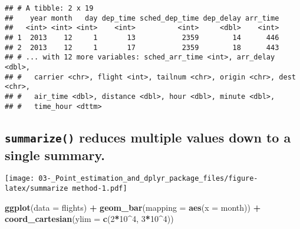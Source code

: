 \documentclass[]{article}
\newenvironment{Shaded}{\begin{snugshade}}{\end{snugshade}}
\newcommand{\DataTypeTok}[1]{\textcolor[rgb]{0.13,0.29,0.53}{#1}}
\newcommand{\DecValTok}[1]{\textcolor[rgb]{0.00,0.00,0.81}{#1}}
\newcommand{\KeywordTok}[1]{\textcolor[rgb]{0.13,0.29,0.53}{\textbf{#1}}}
\newcommand{\NormalTok}[1]{#1}
\newcommand{\OperatorTok}[1]{\textcolor[rgb]{0.81,0.36,0.00}{\textbf{#1}}}
\newcommand{\StringTok}[1]{\textcolor[rgb]{0.31,0.60,0.02}{#1}}
\begin{document}
\begin{verbatim}
## # A tibble: 2 x 19
##    year month   day dep_time sched_dep_time dep_delay arr_time
##   <int> <int> <int>    <int>          <int>     <dbl>    <int>
## 1  2013    12     1       13           2359        14      446
## 2  2013    12     1       17           2359        18      443
## # ... with 12 more variables: sched_arr_time <int>, arr_delay <dbl>,
## #   carrier <chr>, flight <int>, tailnum <chr>, origin <chr>, dest <chr>,
## #   air_time <dbl>, distance <dbl>, hour <dbl>, minute <dbl>,
## #   time_hour <dttm>
\end{verbatim}

\hypertarget{summarize-reduces-multiple-values-down-to-a-single-summary.}{%
\subsection{\texorpdfstring{\texttt{summarize()} reduces multiple values
down to a single
summary.}{summarize() reduces multiple values down to a single summary.}}\label{summarize-reduces-multiple-values-down-to-a-single-summary.}}

\begin{Shaded}
\end{Shaded}

\texttt{[image: 03-\_Point\_estimation\_and\_dplyr\_package\_files/figure-latex/summarize method-1.pdf]}

\begin{Shaded}
\begin{Highlighting}[]
\KeywordTok{ggplot}\NormalTok{(}\DataTypeTok{data =}\NormalTok{ flights) }\OperatorTok{+}\StringTok{ }
\StringTok{  }\KeywordTok{geom_bar}\NormalTok{(}\DataTypeTok{mapping =} \KeywordTok{aes}\NormalTok{(}\DataTypeTok{x =}\NormalTok{ month)) }\OperatorTok{+}
\StringTok{ }\KeywordTok{coord_cartesian}\NormalTok{(}\DataTypeTok{ylim =} \KeywordTok{c}\NormalTok{(}\DecValTok{2}\OperatorTok{*}\DecValTok{10}\OperatorTok{^}\DecValTok{4}\NormalTok{, }\DecValTok{3}\OperatorTok{*}\DecValTok{10}\OperatorTok{^}\DecValTok{4}\NormalTok{))}
\end{Highlighting}
\end{Shaded}
\end{document}
